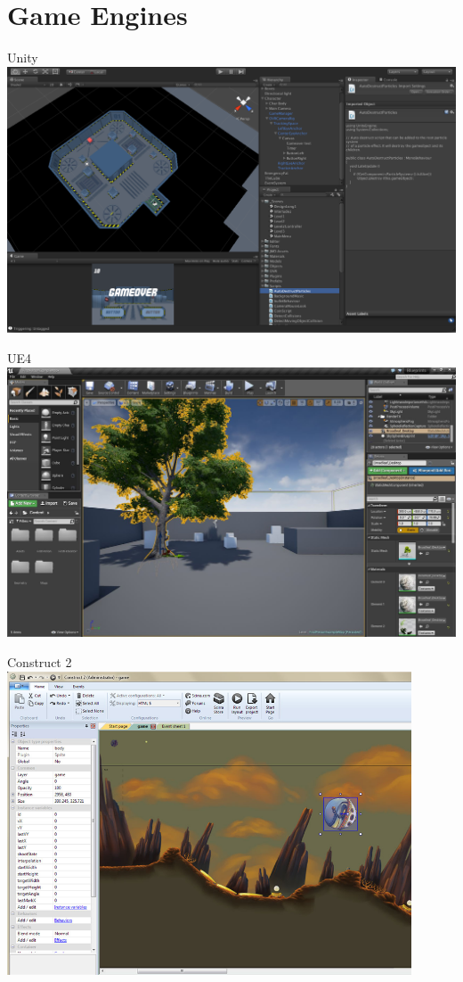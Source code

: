 \part{Game Engines}
\frame{\partpage}

\begin{frame}{Unity}
	\includegraphics[width=1.0\textwidth]{unity}
\end{frame}

\begin{frame}{UE4}
	\includegraphics[width=1.0\textwidth]{ue4}
\end{frame}

\begin{frame}{Construct 2}
	\includegraphics[width=0.9\textwidth]{construct2}
\end{frame}


